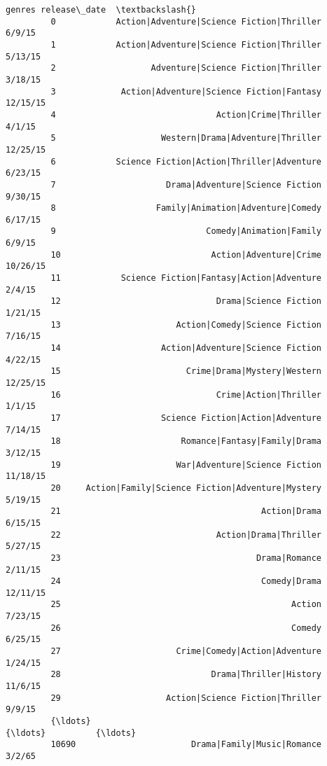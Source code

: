 \documentclass[11pt]{article}
\begin{document}
\begin{Verbatim}[commandchars=\\\{\}]
                                                         genres release\_date  \textbackslash{}
         0            Action|Adventure|Science Fiction|Thriller       6/9/15   
         1            Action|Adventure|Science Fiction|Thriller      5/13/15   
         2                   Adventure|Science Fiction|Thriller      3/18/15   
         3             Action|Adventure|Science Fiction|Fantasy     12/15/15   
         4                                Action|Crime|Thriller       4/1/15   
         5                     Western|Drama|Adventure|Thriller     12/25/15   
         6            Science Fiction|Action|Thriller|Adventure      6/23/15   
         7                      Drama|Adventure|Science Fiction      9/30/15   
         8                    Family|Animation|Adventure|Comedy      6/17/15   
         9                              Comedy|Animation|Family       6/9/15   
         10                              Action|Adventure|Crime     10/26/15   
         11            Science Fiction|Fantasy|Action|Adventure       2/4/15   
         12                               Drama|Science Fiction      1/21/15   
         13                       Action|Comedy|Science Fiction      7/16/15   
         14                    Action|Adventure|Science Fiction      4/22/15   
         15                         Crime|Drama|Mystery|Western     12/25/15   
         16                               Crime|Action|Thriller       1/1/15   
         17                    Science Fiction|Action|Adventure      7/14/15   
         18                        Romance|Fantasy|Family|Drama      3/12/15   
         19                       War|Adventure|Science Fiction     11/18/15   
         20     Action|Family|Science Fiction|Adventure|Mystery      5/19/15   
         21                                        Action|Drama      6/15/15   
         22                               Action|Drama|Thriller      5/27/15   
         23                                       Drama|Romance      2/11/15   
         24                                        Comedy|Drama     12/11/15   
         25                                              Action      7/23/15   
         26                                              Comedy      6/25/15   
         27                       Crime|Comedy|Action|Adventure      1/24/15   
         28                              Drama|Thriller|History      11/6/15   
         29                     Action|Science Fiction|Thriller       9/9/15   
         {\ldots}                                                {\ldots}          {\ldots}   
         10690                       Drama|Family|Music|Romance       3/2/65   

\end{Verbatim}
\end{document}
